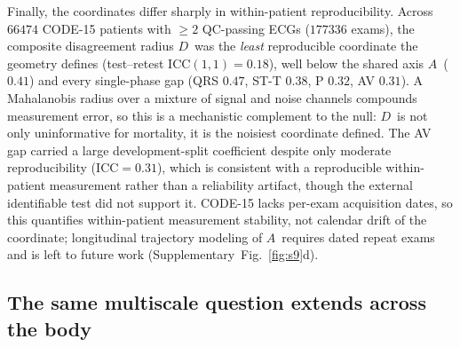 \documentclass[11pt]{article}
\newcommand{\D}{\ensuremath{D}}
\newcommand{\A}{\ensuremath{A}}
\begin{document}
Finally, the coordinates differ sharply in within-patient reproducibility. Across
$\num{66474}$ CODE-15 patients with $\ge 2$ QC-passing ECGs ($\num{177336}$ exams), the
composite disagreement radius \D\ was the \emph{least} reproducible coordinate the geometry
defines (test--retest $\mathrm{ICC}(1,1)=\num{0.18}$), well below the shared axis \A\
($\num{0.41}$) and every single-phase gap (QRS $\num{0.47}$, ST-T $\num{0.38}$, P
$\num{0.32}$, AV $\num{0.31}$). A Mahalanobis radius over a mixture of signal and noise
channels compounds measurement error, so this is a mechanistic complement to the null: \D\
is not only uninformative for mortality, it is the noisiest coordinate defined. The AV
gap carried a large development-split coefficient despite only moderate reproducibility
($\mathrm{ICC}=\num{0.31}$), which is consistent with a reproducible within-patient measurement rather than a
reliability artifact, though the external identifiable test did not support it. CODE-15 lacks per-exam acquisition dates, so this quantifies
within-patient measurement stability, not calendar drift of the coordinate; longitudinal
trajectory modeling of \A\ requires dated repeat exams and is left to future work
(Supplementary~Fig.~\ref{fig:s9}d).

\subsection{The same multiscale question extends across the body}
\label{sec:crossscale}
\end{document}
